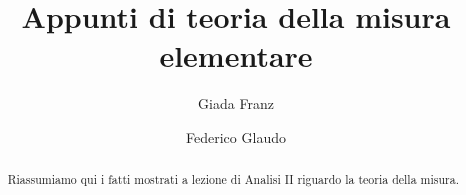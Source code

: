 \documentclass[a4paper,12pt]{article}
\title{Appunti di teoria della misura elementare}
\author{Giada Franz \and Federico Glaudo}
\begin{document}
\maketitle


\begin{abstract}
	Riassumiamo qui i fatti mostrati a lezione di Analisi II riguardo la teoria della misura.
\end{abstract}
\clearpage




\end{document}
